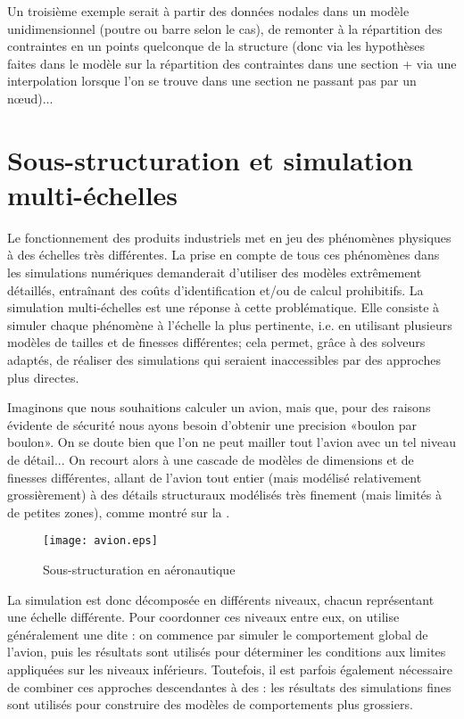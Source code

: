 \medskip
Un troisième exemple serait à partir des données nodales dans un modèle unidimensionnel (poutre ou barre selon le cas), de remonter à la répartition des contraintes en un points quelconque de la structure (donc via les hypothèses faites dans le modèle sur la répartition des contraintes dans une section + via une interpolation lorsque l'on se trouve dans une section ne passant pas par un nœud)...



\medskip
\section{Sous-structuration et simulation multi-échelles}\label{Sec-ssstruc}

Le fonctionnement des produits industriels met en jeu des phénomènes physiques à des échelles très différentes. La prise en compte de tous ces phénomènes dans les simulations numériques demanderait d'utiliser des modèles extrêmement détaillés, entraînant des coûts d'identification et/ou de calcul prohibitifs. La simulation multi-échelles est une réponse à cette problématique. Elle consiste à simuler chaque phénomène à l'échelle la plus pertinente, i.e. en utilisant plusieurs modèles de tailles et de finesses différentes; cela permet, grâce à des solveurs adaptés, de réaliser des simulations qui seraient inaccessibles par des approches plus directes.

\medskip
Imaginons que nous souhaitions calculer un avion, mais que, pour des raisons évidente de sécurité nous ayons besoin d'obtenir une precision «boulon par boulon». On se doute bien que l'on ne peut mailler tout l'avion avec un tel niveau de détail... On recourt alors à une cascade de modèles de dimensions et de finesses différentes, allant de l'avion tout entier (mais modélisé relativement grossièrement) à des détails structuraux modélisés très finement (mais limités à de petites zones), comme montré sur la .
\begin{figure}[ht]
\centering\texttt{[image: avion.eps]}
\caption{Sous-structuration en aéronautique}\label{Fig-avion}
\end{figure}

La simulation est donc décomposée en différents niveaux, chacun représentant une échelle différente. Pour coordonner ces niveaux entre eux, on utilise généralement une  dite : on commence par simuler le comportement global de l'avion, puis les résultats sont utilisés pour déterminer les conditions aux limites appliquées sur les niveaux inférieurs. Toutefois, il est parfois également nécessaire de combiner ces approches descendantes
à des : les résultats des simulations fines sont utilisés pour construire des modèles de comportements plus grossiers.


